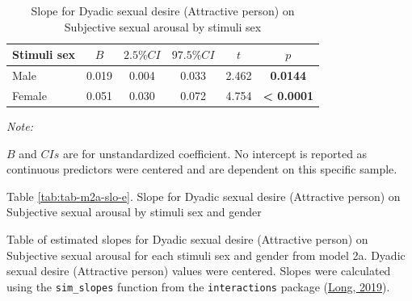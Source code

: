 \documentclass[
  bookmarksnumbered]{article}
\begin{document}
\begin{table}[H]

\caption{\label{tab:tab-m2a-slo-d}Slope for Dyadic sexual desire (Attractive person) on 
        Subjective sexual arousal by stimuli sex}
\centering
\begin{threeparttable}
\begin{tabular}[t]{lccccc}
\toprule
Stimuli sex & $B$ & $2.5\% CI$ & $97.5\% CI$ & $t$ & $p$\\
\midrule
Male & 0.019 & 0.004 & 0.033 & 2.462 & \textbf{0.0144}\\
Female & 0.051 & 0.030 & 0.072 & 4.754 & \textbf{< 0.0001}\\
\bottomrule
\end{tabular}
\begin{tablenotes}[para]
\item \textit{Note: } 
\item $B$ and $CIs$ are for unstandardized coefficient.
           No intercept is reported as continuous predictors were centered
           and are dependent on this specific sample.
\end{tablenotes}
\end{threeparttable}
\end{table}

Table \ref{tab:tab-m2a-slo-e}. Slope for Dyadic sexual desire (Attractive person) on Subjective sexual arousal by stimuli sex and gender

Table of estimated slopes for Dyadic sexual desire (Attractive person) on Subjective sexual arousal for each stimuli sex and gender from model 2a. Dyadic sexual desire (Attractive person) values were centered. Slopes were calculated using the \texttt{sim\_slopes} function from the \texttt{interactions} package (\protect\hyperlink{ref-interactionscit}{Long, 2019}).
\end{document}
